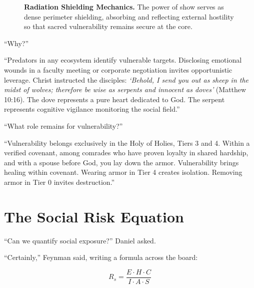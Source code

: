 \documentclass[11pt]{report}
\begin{document}
\begin{figure}[H]
\caption{\textbf{Radiation Shielding Mechanics.} The power of show serves as dense perimeter shielding, absorbing and reflecting external hostility so that sacred vulnerability remains secure at the core.}
\label{fig:shield}
\end{figure}

``Why?''

``Predators in any ecosystem identify vulnerable targets. Disclosing emotional wounds in a faculty meeting or corporate negotiation invites opportunistic leverage. Christ instructed the disciples: \textit{`Behold, I send you out as sheep in the midst of wolves; therefore be wise as serpents and innocent as doves'} (Matthew 10:16). The dove represents a pure heart dedicated to God. The serpent represents cognitive vigilance monitoring the social field.''

``What role remains for vulnerability?''

``Vulnerability belongs exclusively in the Holy of Holies, Tiers 3 and 4. Within a verified covenant, among comrades who have proven loyalty in shared hardship, and with a spouse before God, you lay down the armor. Vulnerability brings healing within covenant. Wearing armor in Tier 4 creates isolation. Removing armor in Tier 0 invites destruction.''

\chapter{The Social Risk Equation}

``Can we quantify social exposure?'' Daniel asked.

``Certainly,'' Feynman said, writing a formula across the board:

\begin{equation}
R_s = \frac{E \cdot H \cdot C}{I \cdot A \cdot S}
\end{equation}
\end{document}
